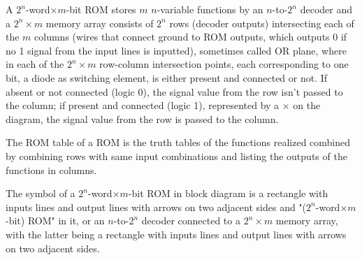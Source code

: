 \documentclass[a4paper,12pt]{article}
\begin{document}
\begin{itemize}
\begin{itemize}
\begin{itemize}
\begin{itemize}
\begin{itemize}
\begin{itemize}
\begin{itemize}
A $2^n$-word$\times m$-bit ROM stores $m$ $n$-variable functions by an $n$-to-$2^n$ decoder and a $2^n\times m$ memory array consists of $2^n$ rows (decoder outputs) intersecting each of the $m$ columns (wires that connect ground to ROM outputs, which outputs 0 if no 1 signal from the input lines is inputted), sometimes called OR plane, where in each of the $2^n\times m$ row-column intersection points, each corresponding to one bit, a diode as switching element, is either present and connected or not. If absent or not connected (logic 0), the signal value from the row isn't passed to the column; if present and connected (logic 1), represented by a $\times$ on the diagram, the signal value from the row is passed to the column.

The ROM table of a ROM is the truth tables of the functions realized combined by combining rows with same input combinations and listing the outputs of the functions in columns.

The symbol of a $2^n$-word$\times m$-bit ROM in block diagram is a rectangle with inputs lines and output lines with arrows on two adjacent sides and "($2^n$-word$\times m$-bit) ROM" in it, or an $n$-to-$2^n$ decoder connected to a $2^n\times m$ memory array, with the latter being a rectangle with inputs lines and output lines with arrows on two adjacent sides.


\end{itemize}
\end{itemize}
\end{itemize}
\end{itemize}
\end{itemize}
\end{itemize}
\end{itemize}
\end{document}

